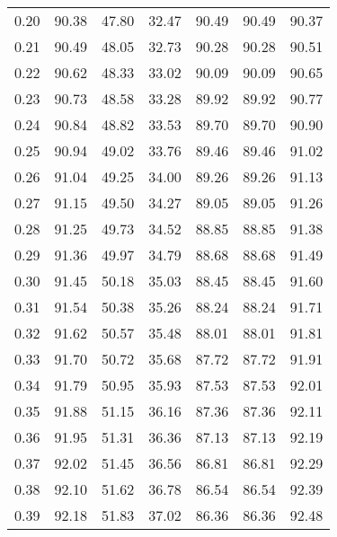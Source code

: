 \begin{tabular}{|c|c|c|c|c|c|c|}
      0.20 &     90.38 &     47.80 &      32.47 &   90.49 &      90.49 &         90.37 \\
      0.21 &     90.49 &     48.05 &      32.73 &   90.28 &      90.28 &         90.51 \\
      0.22 &     90.62 &     48.33 &      33.02 &   90.09 &      90.09 &         90.65 \\
      0.23 &     90.73 &     48.58 &      33.28 &   89.92 &      89.92 &         90.77 \\
      0.24 &     90.84 &     48.82 &      33.53 &   89.70 &      89.70 &         90.90 \\
      0.25 &     90.94 &     49.02 &      33.76 &   89.46 &      89.46 &         91.02 \\
      0.26 &     91.04 &     49.25 &      34.00 &   89.26 &      89.26 &         91.13 \\
      0.27 &     91.15 &     49.50 &      34.27 &   89.05 &      89.05 &         91.26 \\
      0.28 &     91.25 &     49.73 &      34.52 &   88.85 &      88.85 &         91.38 \\
      0.29 &     91.36 &     49.97 &      34.79 &   88.68 &      88.68 &         91.49 \\
      0.30 &     91.45 &     50.18 &      35.03 &   88.45 &      88.45 &         91.60 \\
      0.31 &     91.54 &     50.38 &      35.26 &   88.24 &      88.24 &         91.71 \\
      0.32 &     91.62 &     50.57 &      35.48 &   88.01 &      88.01 &         91.81 \\
      0.33 &     91.70 &     50.72 &      35.68 &   87.72 &      87.72 &         91.91 \\
      0.34 &     91.79 &     50.95 &      35.93 &   87.53 &      87.53 &         92.01 \\
      0.35 &     91.88 &     51.15 &      36.16 &   87.36 &      87.36 &         92.11 \\
      0.36 &     91.95 &     51.31 &      36.36 &   87.13 &      87.13 &         92.19 \\
      0.37 &     92.02 &     51.45 &      36.56 &   86.81 &      86.81 &         92.29 \\
      0.38 &     92.10 &     51.62 &      36.78 &   86.54 &      86.54 &         92.39 \\
      0.39 &     92.18 &     51.83 &      37.02 &   86.36 &      86.36 &         92.48 \\

\end{tabular}

